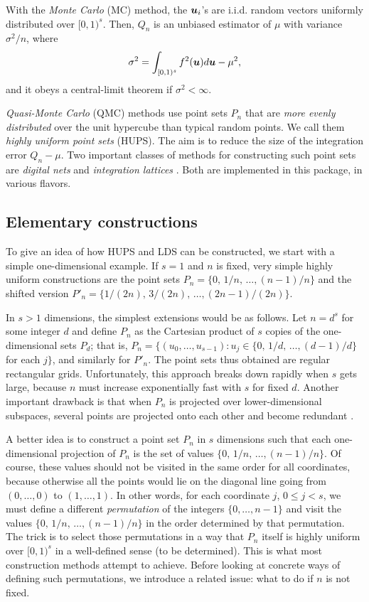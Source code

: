 With the \emph{Monte Carlo} (MC) method, the $\mbox{\boldmath $u$}_i$'s are
i.i.d.{} random vectors uniformly distributed over $[0,1)^s$.
Then, $Q_n$ is an unbiased estimator of $\mu$ with variance
$\sigma^2/n$, where
\begin{equation}
 \sigma^2 = \int_{[0,1)^s} f^2(\mbox{\boldmath $u$}) d\mbox{\boldmath $u$} - \mu^2,
\end{equation}
and it obeys a central-limit theorem if $\sigma^2 < \infty$.

\emph{Quasi-Monte Carlo} (QMC) methods use point sets $P_n$
that are \emph{more evenly distributed} over the unit hypercube
than typical random points.
We call them \emph{highly uniform point sets} (HUPS).
The aim is to reduce the size of the integration error $Q_n - \mu$.
Two important classes of methods for constructing such point sets are
\emph{digital nets} and \emph{integration lattices}
\cite{rNIE92b,vSLO94a,vLEC02a,fGLA04a}.
Both are implemented in this package, in various flavors.


\subsection*{Elementary constructions}

To give an idea of how HUPS and LDS can be constructed, we start with
a simple one-dimensional example.
If $s=1$ and $n$ is fixed, very simple highly uniform constructions are
the point sets $P_n = \{0,\, 1/n,\, \dots, (n-1)/n\}$ and
the shifted version $P'_n = \{1/(2n),\, 3/(2n),\, \dots, (2n-1)/(2n)\}$.

In $s > 1$ dimensions, the simplest extensions would be as follows.
Let $n = d^s$ for some integer $d$ and define $P_n$ as the
Cartesian product of $s$ copies of the one-dimensional sets $P_d$;
that is, $P_n = \{(u_0,\dots,u_{s-1}) :
u_j \in \{0,\, 1/d,\, \dots, (d-1)/d\}$ for each $j\}$,
and similarly for $P'_n$.
The point sets thus obtained are regular rectangular grids.
Unfortunately, this approach breaks down rapidly when $s$ gets large,
because $n$ must increase exponentially fast with $s$ for fixed $d$.
Another important drawback is that when $P_n$ is projected over
lower-dimensional subspaces, several points are projected onto each other
and become redundant \cite{vLEC02a}.

A better idea is to construct a point set $P_n$ in $s$ dimensions
such that each one-dimensional projection of $P_n$ is the set
of values $\{0,\, 1/n,\, \dots, (n-1)/n\}$.
Of course, these values should not be visited in the same order for
all coordinates, because otherwise all the points would lie on the
diagonal line going from $(0,\dots,0)$ to $(1,\dots,1)$.
In other words, for each coordinate $j$, $0\le j < s$, we must define
a different \emph{permutation} of the integers $\{0,\dots,n-1\}$ and
visit the values $\{0,\, 1/n,\, \dots, (n-1)/n\}$ in the order determined
by that permutation.  The trick is to select those permutations in a
way that $P_n$ itself is highly uniform over $[0,1)^s$ in a well-defined
sense (to be determined).
This is what most construction methods attempt to achieve.
Before looking at concrete ways of defining such permutations,
we introduce a related issue: what to do if $n$ is not fixed.

